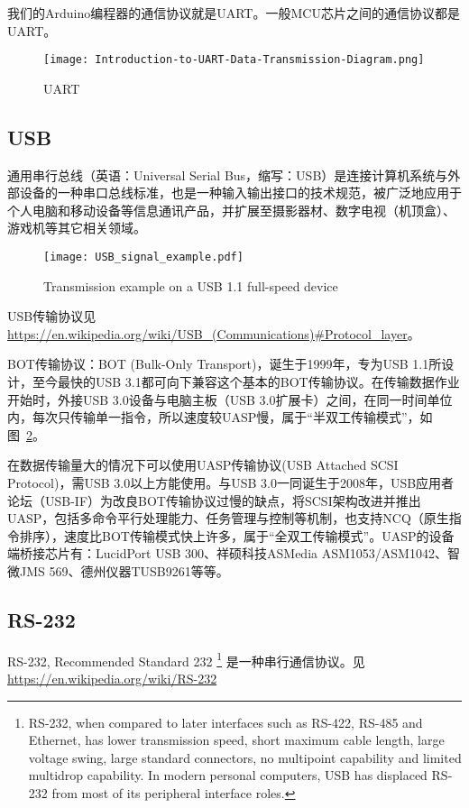 我们的Arduino编程器的通信协议就是UART。一般MCU芯片之间的通信协议都是UART。

\begin{figure}[htbp]
    \centering
    \texttt{[image: Introduction-to-UART-Data-Transmission-Diagram.png]}
    \caption{UART}
    \label{fig:UART}
\end{figure}

\subsection{USB}

通用串行总线（英语：Universal Serial Bus，缩写：USB）是连接计算机系统与外部设备的一种串口总线标准，也是一种输入输出接口的技术规范，被广泛地应用于个人电脑和移动设备等信息通讯产品，并扩展至摄影器材、数字电视（机顶盒）、游戏机等其它相关领域。

\begin{figure}[htbp]
    \centering
    \texttt{[image: USB\_signal\_example.pdf]}
    \caption{Transmission example on a USB 1.1 full-speed device}
    \label{fig:USB-Transmission}
\end{figure}

USB传输协议见\url{https://en.wikipedia.org/wiki/USB_(Communications)#Protocol_layer}。

BOT传输协议：BOT (Bulk-Only Transport)，诞生于1999年，专为USB 1.1所设计，至今最快的USB 3.1都可向下兼容这个基本的BOT传输协议。在传输数据作业开始时，外接USB 3.0设备与电脑主板（USB 3.0扩展卡）之间，在同一时间单位内，每次只传输单一指令，所以速度较UASP慢，属于“半双工传输模式”，如图~\ref{fig:USB-Transmission}。

在数据传输量大的情况下可以使用UASP传输协议(USB Attached SCSI Protocol)，需USB 3.0以上方能使用。与USB 3.0一同诞生于2008年，USB应用者论坛（USB-IF）为改良BOT传输协议过慢的缺点，将SCSI架构改进并推出UASP，包括多命令平行处理能力、任务管理与控制等机制，也支持NCQ（原生指令排序），速度比BOT传输模式快上许多，属于“全双工传输模式”。UASP的设备端桥接芯片有：LucidPort USB 300、祥硕科技ASMedia ASM1053/ASM1042、智微JMS 569、德州仪器TUSB9261等等。

\subsection{RS-232}

RS-232, Recommended Standard 232 \footnote{RS-232, when compared to later interfaces such as RS-422, RS-485 and Ethernet, has lower transmission speed, short maximum cable length, large voltage swing, large standard connectors, no multipoint capability and limited multidrop capability. In modern personal computers, USB has displaced RS-232 from most of its peripheral interface roles.} 是一种串行通信协议。见\url{https://en.wikipedia.org/wiki/RS-232}

